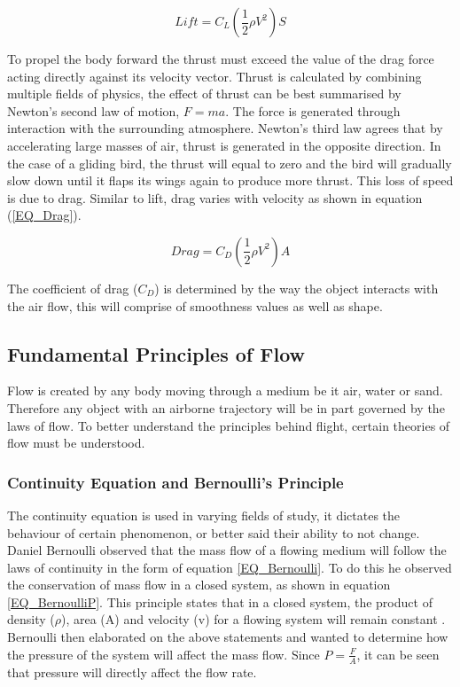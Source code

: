 \begin{equation}
\label{EQ_Lift}
Lift = C_L(\frac{1}{2} \rho V^2) S
\end{equation}

To propel the body forward the thrust must exceed the value of the drag force acting directly against its velocity vector. Thrust is calculated by combining multiple fields of physics, the effect of thrust can be best summarised by Newton's second law of motion, $F=ma$. The force is generated through interaction with the surrounding atmosphere. Newton's third law agrees that by accelerating large masses of air, thrust is generated in the opposite direction. In the case of a gliding bird, the thrust will equal to zero and the bird will gradually slow down until it flaps its wings again to produce more thrust. This loss of speed is due to drag. Similar to lift, drag varies with velocity as shown in equation (\ref{EQ_Drag}).

\begin{equation}
\label{EQ_Drag}
Drag = C_D (\frac{1}{2} \rho V^2) A
\end{equation}

The coefficient of drag ($C_D$) is determined by the way the object interacts with the air flow, this will comprise of smoothness values as well as shape. 


\subsection{Fundamental Principles of Flow}
Flow is created by any body moving through a medium be it air, water or sand. Therefore any object with an airborne trajectory will be in part governed by the laws of flow. To better understand the principles behind flight, certain theories of flow must be understood.

\subsubsection{Continuity Equation and Bernoulli's Principle}
The continuity equation is used in varying fields of study, it dictates the behaviour of certain phenomenon, or better said their ability to not change. Daniel Bernoulli observed that the mass flow of a flowing medium will follow the laws of continuity in the form of equation \eqref{EQ_Bernoulli}. To do this he observed the conservation of mass flow in a closed system, as shown in equation \eqref{EQ_BernoulliP}. This principle states that in a closed system, the product of density ($\rho$), area (A) and velocity (v) for a flowing system will remain constant \cite{Dayle}. Bernoulli then elaborated on the above statements and wanted to determine how the pressure of the system will affect the mass flow. Since $P = \frac{F}{A}$, it can be seen that pressure will directly affect the flow rate.

